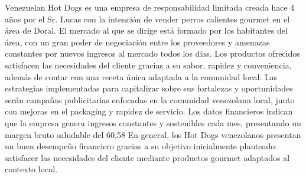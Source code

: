Venezuelan Hot Dogs es una empresa de responsabilidad limitada creada hace 4 años por el Sr. Lucas con la intención de vender perros calientes gourmet en el área de Doral. El mercado al que se dirige está formado por los habitantes del área, con un gran poder de negociación entre los proveedores y amenazas constantes por nuevos ingresos al mercado todos los días. Los productos ofrecidos satisfacen las necesidades del cliente gracias a su sabor, rapidez y conveniencia, además de contar con una receta única adaptada a la comunidad local. Las estrategias implementadas para capitalizar sobre sus fortalezas y oportunidades serán campañas publicitarias enfocadas en la comunidad venezolana local, junto con mejoras en el packaging y rapidez de servicio.
Los datos financieros indican que la empresa genera ingresos constantes y sostenibles cada mes, presentando un margen bruto saludable del 60,58%
En general, los Hot Dogs venezolanos presentan un buen desempeño financiero gracias a su objetivo inicialmente planteado: satisfacer las necesidades del cliente mediante productos gourmet adaptados al contexto local.
